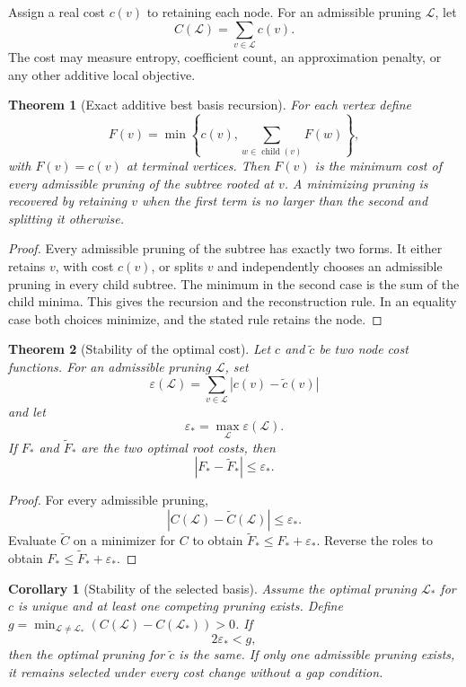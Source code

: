 \documentclass[11pt,letterpaper]{article}
\newtheorem{theorem}{Theorem}[section]
\theoremstyle{plain}
\theoremstyle{plain}
\theoremstyle{plain}
\newtheorem{corollary}[corollary]{Corollary}
\theoremstyle{definition}
\theoremstyle{definition}
\theoremstyle{definition}
\theoremstyle{definition}
\theoremstyle{remark}
\theoremstyle{remark}
\theoremstyle{remark}
\theoremstyle{remark}
\newcommand{\Lcal}{\mathcal L}
\begin{document}
Assign a real cost \(c(v)\) to retaining each node. For an admissible pruning \(\Lcal\), let
\[
C(\Lcal)=\sum_{v\in\Lcal}c(v).
\]
The cost may measure entropy, coefficient count, an approximation penalty, or any other additive local objective.

\begin{theorem}[Exact additive best basis recursion]\label{thm:best_basis}
For each vertex define
\[
F(v)
=
\min\left\{
 c(v),
 \sum_{w\in\operatorname{child}(v)}F(w)
\right\},
\]
with \(F(v)=c(v)\) at terminal vertices. Then \(F(v)\) is the minimum cost of every admissible pruning of the subtree rooted at \(v\). A minimizing pruning is recovered by retaining \(v\) when the first term is no larger than the second and splitting it otherwise.
\end{theorem}

\begin{proof}
Every admissible pruning of the subtree has exactly two forms. It either retains \(v\), with cost \(c(v)\), or splits \(v\) and independently chooses an admissible pruning in every child subtree. The minimum in the second case is the sum of the child minima. This gives the recursion and the reconstruction rule. In an equality case both choices minimize, and the stated rule retains the node.
\end{proof}

\begin{theorem}[Stability of the optimal cost]\label{thm:best_basis_cost_stability}
Let \(c\) and \(\widetilde c\) be two node cost functions. For an admissible pruning \(\Lcal\), set
\[
\varepsilon(\Lcal)
=
\sum_{v\in\Lcal}|c(v)-\widetilde c(v)|
\]
and let
\[
\varepsilon_*
=
\max_{\Lcal}\varepsilon(\Lcal).
\]
If \(F_*\) and \(\widetilde F_*\) are the two optimal root costs, then
\[
|F_*-\widetilde F_*|
\leq
\varepsilon_*.
\]
\end{theorem}

\begin{proof}
For every admissible pruning,
\[
|C(\Lcal)-\widetilde C(\Lcal)|
\leq
\varepsilon_*.
\]
Evaluate \(\widetilde C\) on a minimizer for \(C\) to obtain \(\widetilde F_*\leq F_*+\varepsilon_*\). Reverse the roles to obtain \(F_*\leq\widetilde F_*+\varepsilon_*\).
\end{proof}

\begin{corollary}[Stability of the selected basis]\label{cor:best_basis_selection_stability}
Assume the optimal pruning \(\Lcal_*\) for \(c\) is unique and at least one competing pruning exists. Define \(g=\min_{\Lcal\ne\Lcal_*}(C(\Lcal)-C(\Lcal_*))>0\). If
\[
2\varepsilon_*<g,
\]
then the optimal pruning for \(\widetilde c\) is the same. If only one admissible pruning exists, it remains selected under every cost change without a gap condition.
\end{corollary}
\end{document}
